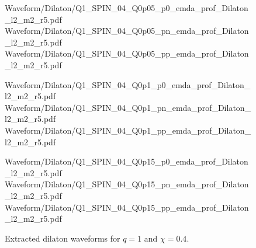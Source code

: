 \begin{figure}[p]
\centering

{Waveform/Dilaton/Q1_SPIN_04_Q0p05_p0_emda_prof_Dilaton_l2_m2_r5.pdf}
\hfill
{}
{Waveform/Dilaton/Q1_SPIN_04_Q0p05_pn_emda_prof_Dilaton_l2_m2_r5.pdf}
\hfill
{}
{Waveform/Dilaton/Q1_SPIN_04_Q0p05_pp_emda_prof_Dilaton_l2_m2_r5.pdf}

\vspace{0.6em}

{Waveform/Dilaton/Q1_SPIN_04_Q0p1_p0_emda_prof_Dilaton_l2_m2_r5.pdf}
\hfill
{}
{Waveform/Dilaton/Q1_SPIN_04_Q0p1_pn_emda_prof_Dilaton_l2_m2_r5.pdf}
\hfill
{}
{Waveform/Dilaton/Q1_SPIN_04_Q0p1_pp_emda_prof_Dilaton_l2_m2_r5.pdf}

\vspace{0.6em}

{Waveform/Dilaton/Q1_SPIN_04_Q0p15_p0_emda_prof_Dilaton_l2_m2_r5.pdf}
\hfill
{}
{Waveform/Dilaton/Q1_SPIN_04_Q0p15_pn_emda_prof_Dilaton_l2_m2_r5.pdf}
\hfill
{}
{Waveform/Dilaton/Q1_SPIN_04_Q0p15_pp_emda_prof_Dilaton_l2_m2_r5.pdf}

\caption{Extracted dilaton waveforms for $q=1$ and $\chi=0.4$.}
\label{fig:dilaton_catalog_q1_chi04}
\end{figure}

